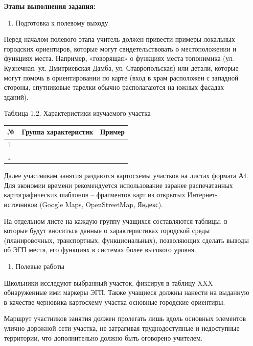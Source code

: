 \documentclass[
  11pt,
  russian,
]{book}
\providecommand{\tightlist}{%
  \setlength{\itemsep}{0pt}\setlength{\parskip}{0pt}}
\begin{document}
\textbf{Этапы выполнения задания:}

\begin{enumerate}
\def\labelenumi{\arabic{enumi}.}
\tightlist
\item
  Подготовка к полевому выходу
\end{enumerate}

Перед началом полевого этапа учитель должен привести примеры локальных городских ориентиров, которые могут свидетельствовать о местоположении и функциях места. Например, «говорящая» о функциях места топонимика (ул. Кузнечная, ул. Дмитриевская Дамба, ул. Ставропольская) или детали, которые могут помочь в ориентировании по карте (вход в храм расположен с западной стороны, спутниковые тарелки обычно располагаются на южных фасадах зданий).

Таблица 1.2. Характеристики изучаемого участка

\begin{longtable}[]{@{}lll@{}}
\toprule
№ & Группа характеристик & Пример \\
\midrule
\endhead
1 & ~ & ~ \\
\ldots{} & ~ & ~ \\
\bottomrule
\end{longtable}

Далее участникам занятия раздаются картосхемы участков на листах формата А4. Для экономии времени рекомендуется использование заранее распечатанных картографических шаблонов -- фрагментов карт из открытых Интернет-источников (Google Maps, OpenStreetMap, Яндекс).

На отдельном листе на каждую группу учащихся составляются таблицы, в которые будут вноситься данные о характеристиках городской среды (планировочных, транспортных, функциональных), позволяющих сделать выводы об ЭГП места, его функциях в системах более высокого уровня.

\begin{enumerate}
\def\labelenumi{\arabic{enumi}.}
\setcounter{enumi}{1}
\tightlist
\item
  Полевые работы
\end{enumerate}

Школьники исследуют выбранный участок, фиксируя в таблицу XXX обнаруженные ими маркеры ЭГП. Также учащиеся должны нанести на выданную в качестве черновика картосхему участка основные городские ориентиры.

Маршрут участников занятия должен пролегать лишь вдоль основных элементов улично-дорожной сети участка, не затрагивая труднодоступные и недоступные территории, что дополнительно должно быть оговорено учителем.
\end{document}
